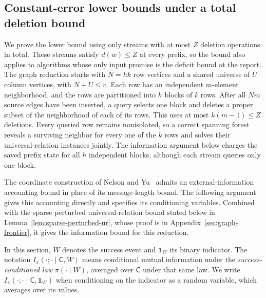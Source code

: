 \documentclass[11pt,letterpaper]{article}
\numberwithin{equation}{section}
\begin{document}
\subsection{Constant-error lower bounds under a total deletion bound}
\label{sec:indexed-block}

We prove the lower bound using only streams with at most $Z$ deletion operations in total.
These streams satisfy $d(w)\le Z$ at every prefix, so the bound also applies to algorithms whose only input promise is the deficit bound at the report.
The graph reduction starts with $N=hk$ row vertices and a shared universe of $U$ column vertices, with $N+U\le v$.
Each row has an independent $m$-element neighborhood, and the rows are partitioned into $h$ blocks of $k$ rows.
After all $Nm$ source edges have been inserted, a query selects one block and deletes a proper subset of the neighborhood of each of its rows.
This uses at most $k(m-1)\le Z$ deletions.
Every queried row remains nonisolated, so a correct spanning forest reveals a surviving neighbor for every one of the $k$ rows and solves their universal-relation instances jointly.
The information argument below charges the saved prefix state for all $h$ independent blocks, although each stream queries only one block.

The coordinate construction of Nelson and Yu~\cite[Lemma~3]{NelsonYu2019} admits an external-information accounting bound in place of its message-length bound.
The following argument gives this accounting directly and specifies its conditioning variables.
Combined with the sparse perturbed universal-relation bound stated below in Lemma~\ref{lem:sparse-perturbed-ur}, whose proof is in Appendix~\ref{sec:graph-frontier}, it gives the information bound for this reduction.

In this section, $W$ denotes the success event and $\mathbf{1}_W$ its binary indicator.
The notation $I_\pi(\cdot;\cdot\mid \mathsf{C},W)$ means conditional mutual information under the \emph{success-conditioned law} $\pi(\cdot\mid W)$, averaged over $\mathsf{C}$ under that same law.
We write $I_\pi(\cdot;\cdot\mid \mathsf{C},\mathbf{1}_W)$ when conditioning on the indicator as a random variable, which averages over its values.
\end{document}
